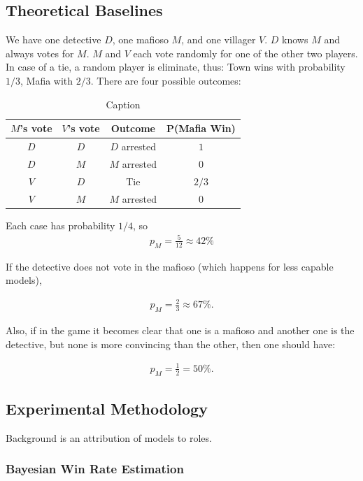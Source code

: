 \documentclass{article}
\begin{document}
\subsection{Theoretical Baselines}


We have one detective $D$, one mafioso $M$, and one villager $V$.  
$D$ knows $M$ and always votes for $M$.  
$M$ and $V$ each vote randomly for one of the other two players.  
In case of a tie, a random player is eliminate, thus: Town wins with probability $1/3$, Mafia with $2/3$. There are four possible outcomes:
\begin{table}[ht]
    \centering
    \begin{tabular}{|c|c|c|c|}
        \hline
        $M$'s vote & $V$'s vote & Outcome & P(Mafia Win) \\
        \hline
        $D$ & $D$ & $D$ arrested & $1$ \\
        $D$ & $M$ & $M$ arrested & $0$ \\
        $V$ & $D$ & Tie & $2/3$ \\
        $V$ & $M$ & $M$ arrested & $0$ \\
        \hline
    \end{tabular}
    \caption{Caption}
    \label{tab:placeholder}
\end{table}
Each case has probability $1/4$, so
\begin{align}
    p_M=\frac{5}{12}\approx42\%
\end{align}

If the detective does not vote in the mafioso (which happens for less capable models), 

\begin{align}
    p_M=\frac{2}{3}\approx 67\%.
\end{align}

Also, if in the game it becomes clear that one is a mafioso and another one is the detective, but none is more convincing than the other, then one should have:

\begin{align}
    p_M=\frac{1}{2}=50\%.
\end{align}


\subsection{Experimental Methodology}

Background is an attribution of models to roles.

\subsubsection{Bayesian Win Rate Estimation}
\end{document}
